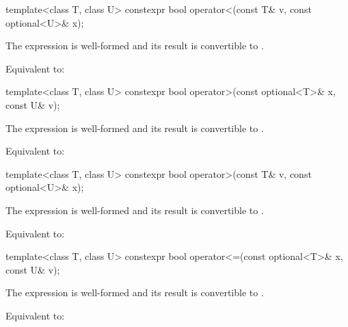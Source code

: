 %
\begin{itemdecl}
template<class T, class U> constexpr bool operator<(const T& v, const optional<U>& x);
\end{itemdecl}

\begin{itemdescr}
\pnum
\constraints
The expression  is well-formed and
its result is convertible to .

\pnum
\effects
Equivalent to: 
\end{itemdescr}

%
\begin{itemdecl}
template<class T, class U> constexpr bool operator>(const optional<T>& x, const U& v);
\end{itemdecl}

\begin{itemdescr}
\pnum
\constraints
The expression  is well-formed and
its result is convertible to .

\pnum
\effects
Equivalent to: 
\end{itemdescr}

%
\begin{itemdecl}
template<class T, class U> constexpr bool operator>(const T& v, const optional<U>& x);
\end{itemdecl}

\begin{itemdescr}
\pnum
\constraints
The expression  is well-formed and
its result is convertible to .

\pnum
\effects
Equivalent to: 
\end{itemdescr}

%
\begin{itemdecl}
template<class T, class U> constexpr bool operator<=(const optional<T>& x, const U& v);
\end{itemdecl}

\begin{itemdescr}
\pnum
\constraints
The expression  is well-formed and
its result is convertible to .

\pnum
\effects
Equivalent to: 
\end{itemdescr}

